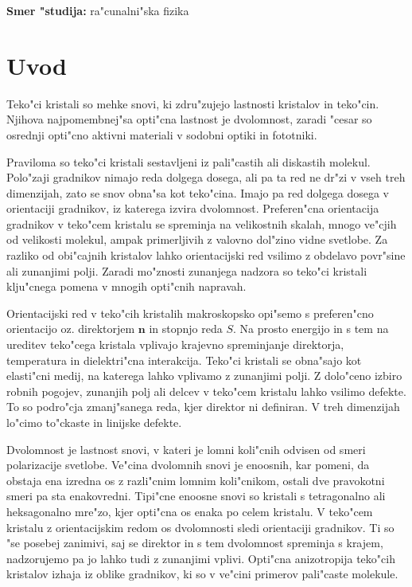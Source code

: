 \documentclass[12pt,twoside,openright,final]{report}
\begin{document}
\bigskip
\vfill

\noindent
{\bf Smer "studija:} ra"cunalni"ska fizika
\vfill

\newpage
\thispagestyle{empty}

\tableofcontents

\chapter{Uvod} %

Teko"ci kristali so mehke snovi, ki zdru"zujejo lastnosti kristalov in teko"cin\cite{degennes}. 
Njihova najpomembnej"sa opti"cna lastnost je dvolomnost, zaradi "cesar so osrednji opti"cno aktivni materiali v sodobni optiki in fototniki.

Praviloma so teko"ci kristali sestavljeni iz pali"castih ali diskastih molekul. 
Polo"zaji gradnikov nimajo reda dolgega dosega, ali pa ta red ne dr"zi v vseh treh dimenzijah, zato se snov obna"sa kot teko"cina. 
Imajo pa red dolgega dosega v orientaciji gradnikov, iz katerega izvira dvolomnost. 
Preferen"cna orientacija gradnikov v teko"cem kristalu se spreminja na velikostnih skalah, mnogo ve"cjih od velikosti molekul, ampak primerljivih z valovno dol"zino vidne svetlobe. 
Za razliko od obi"cajnih kristalov lahko orientacijski red vsilimo z obdelavo povr"sine ali zunanjimi polji. 
Zaradi mo"znosti zunanjega nadzora so teko"ci kristali klju"cnega pomena v mnogih opti"cnih napravah. 

Orientacijski red v teko"cih kristalih makroskopsko opi"semo s preferen"cno orientacijo oz. direktorjem $\mathbf{n}$ in stopnjo reda $S$. 
Na prosto energijo in s tem na ureditev teko"cega kristala vplivajo krajevno spreminjanje direktorja, temperatura in dielektri"cna interakcija. 
Teko"ci kristali se obna"sajo kot elasti"cni medij, na katerega lahko vplivamo z zunanjimi polji. 
Z dolo"ceno izbiro robnih pogojev, zunanjih polj ali delcev v teko"cem kristalu lahko vsilimo defekte. 
To so podro"cja zmanj"sanega reda, kjer direktor ni definiran. 
V treh dimenzijah lo"cimo to"ckaste in linijske defekte. 

Dvolomnost je lastnost snovi, v kateri je lomni koli"cnih odvisen od smeri polarizacije svetlobe\cite{landau-lifsic-optics}. 
Ve"cina dvolomnih snovi je enoosnih, kar pomeni, da obstaja ena izredna os z razli"cnim lomnim koli"cnikom, ostali dve pravokotni smeri pa sta enakovredni. 
Tipi"cne enoosne snovi so kristali s tetragonalno ali heksagonalno mre"zo, kjer opti"cna os enaka po celem kristalu. 
V teko"cem kristalu z orientacijskim redom os dvolomnosti sledi orientaciji gradnikov. 
Ti so "se posebej zanimivi, saj se direktor in s tem dvolomnost spreminja s krajem, nadzorujemo pa jo lahko tudi z zunanjimi vplivi. 
Opti"cna anizotropija teko"cih kristalov izhaja iz oblike gradnikov, ki so v ve"cini primerov pali"caste molekule. 
\end{document}
